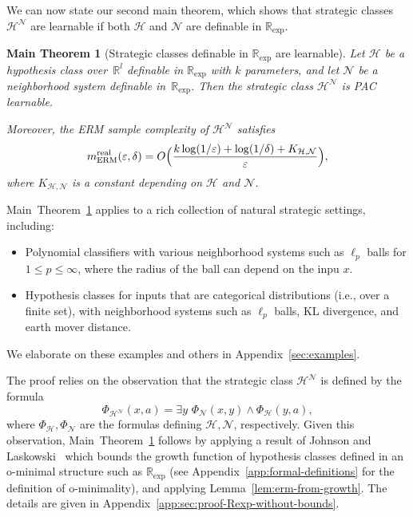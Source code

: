 \documentclass[11pt]{article}
\theoremstyle{plain}
\newtheorem{maintheorem}{Main Theorem}
\theoremstyle{definition}
\theoremstyle{remark}
\begin{document}
We can now state our second main theorem, which shows that strategic classes $\mathcal H^\mathcal N$ are learnable if both $\mathcal H$ and $\mathcal N$ are definable in $\mathbb{R}_{\exp}$.

\begin{maintheorem}[Strategic classes definable in $\mathbb{R}_{\exp}$ are learnable]
\label{main:R_exp}
Let $\mathcal H$ be a hypothesis class over~$\mathbb R^l$ definable in $\mathbb{R}_{\exp}$ with $k$ parameters, and let $\mathcal N$ be a neighborhood system definable in~$\mathbb{R}_{\exp}$. Then the strategic class $\mathcal H^\mathcal N$ is PAC learnable.

Moreover, the ERM sample complexity of $\mathcal H^\mathcal N$ satisfies
\[
m_{\mathrm{ERM}}^{\mathrm{real}}(\varepsilon,\delta)
=
O\Bigl(
\frac{k\log(1/\varepsilon) + \log(1/\delta) + K_{\mathcal{H},\mathcal{N}}}
{\varepsilon}
\Bigr),
\]
where $K_{\mathcal H,\mathcal N}$ is a constant depending on $\mathcal H$ and $\mathcal N$.
\end{maintheorem}

Main~Theorem~\ref{main:R_exp} applies to a rich collection of natural strategic settings, including:
\begin{itemize}[leftmargin=1em,topsep=0em,itemsep=0.2em]
\item Polynomial classifiers with various neighborhood systems such as $\ell_p$ balls for $1 \leq p \leq \infty$, where the radius of the ball can depend on the inpu $x$.
\item Hypothesis classes for inputs that are categorical distributions (i.e., over a finite set), with neighborhood systems such as $\ell_p$ balls, KL divergence, and earth mover distance.
\end{itemize}
We elaborate on these examples and others in Appendix~\ref{sec:examples}. 

The proof relies on the observation that the strategic class $\mathcal H^\mathcal N$ is defined by the formula
\[
 \Phi_{\mathcal{H}^\mathcal{N}}(x,a) = \exists y \,\, \Phi_\mathcal N(x,y) \land \Phi_{\mathcal{H}}(y,a),
\]
where $\Phi_\mathcal H,\Phi_\mathcal N$ are the formulas defining $\mathcal H,\mathcal N$, respectively. Given this observation, Main~Theorem~\ref{main:R_exp} follows by applying a result of Johnson and Laskowski~\cite{LaskowskiCompression} which bounds the growth function of hypothesis classes defined in an o-minimal structure such as $\mathbb R_{\exp}$ (see Appendix~\ref{app:formal-definitions} for the definition of o-minimality), and applying Lemma~\ref{lem:erm-from-growth}. The details are given in Appendix~\ref{app:sec:proof-Rexp-without-bounds}.
\end{document}

